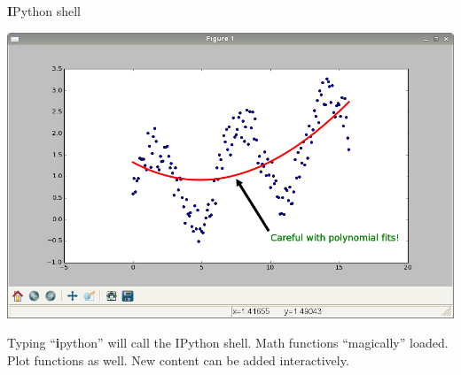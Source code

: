 \documentclass[xcolor=pdftex,dvipsnames,table]{beamer}
\begin{document}
\begin{frame}
\begin{block}{\textbf{I}Python shell}
\begin{overprint}
    \includegraphics[width=\textwidth, height=0.75\textheight]{ipython7.png}
    \end{overprint}
    \begin{overprint}
       Typing ``\textbf{i}python'' will call the IPython shell.
       Math functions ``magically'' loaded.
       Plot functions as well.
       New content can be added interactively.
    \end{overprint}   
  \end{block}
\end{frame}
\end{document}
